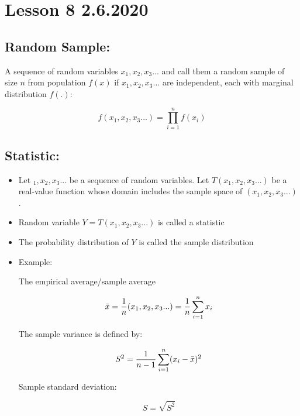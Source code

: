 \documentclass[11pt,letterpaper,titlepage]{article}
\begin{document}
\newpage

\section{Lesson 8 2.6.2020}

\subsection{Random Sample:}

A sequence of random variables $x_1, x_2, x_3...$ and call them a random sample of size $n$ from population $f(x)$ if $x_1, x_2, x_3...$ are independent, each with marginal distribution $f(.)$:

\begin{equation*}
    f(x_1, x_2, x_3...) = \prod_{i=1}^{n} f(x_i)
\end{equation*}

\subsection{Statistic:}

\begin{itemize}

    \item Let $_1, x_2, x_3...$ be a sequence of random variables. Let $T(x_1, x_2, x_3...)$ be a real-value function whose domain includes the sample space of $(x_1, x_2, x_3...)$.
    
    \item Random variable $Y = T(x_1, x_2, x_3...)$ is called a statistic
    
    \item The probability distribution of $Y$ is called the sample distribution
    
    \item Example: 
    
    The empirical average/sample average
    
    \begin{equation*}
        \begin{aligned}
            \Bar{x} = \frac{1}{n}(x_1, x_2, x_3...) = \frac{1}{n} \sum_{i=1}^{n} x_i
        \end{aligned}
    \end{equation*}
    
    The sample variance is defined by:
    
    \begin{equation*}
        S^2 = \frac{1}{n-1} \sum_{i=1}^{n} (x_i - \Bar{x})^2
    \end{equation*}
    
    Sample standard deviation:
    
    \begin{equation*}
        S = \sqrt{S^2}
    \end{equation*}

\end{itemize}
\end{document}
